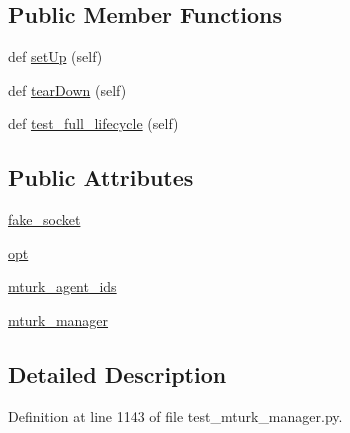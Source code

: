 \subsection*{Public Member Functions}
\begin{DoxyCompactItemize}
\item 
def \hyperlink{classparlai_1_1mturk_1_1core_1_1test_1_1test__mturk__manager_1_1TestMTurkManagerLifecycleFunctions_ad110fce7c0b667907acf9482edea7b3b}{set\+Up} (self)
\item 
def \hyperlink{classparlai_1_1mturk_1_1core_1_1test_1_1test__mturk__manager_1_1TestMTurkManagerLifecycleFunctions_a597cbfdc5382c94258e1be44af00818a}{tear\+Down} (self)
\item 
def \hyperlink{classparlai_1_1mturk_1_1core_1_1test_1_1test__mturk__manager_1_1TestMTurkManagerLifecycleFunctions_ae2a7198f22d5533f4947426457b9fc75}{test\+\_\+full\+\_\+lifecycle} (self)
\end{DoxyCompactItemize}
\subsection*{Public Attributes}
\begin{DoxyCompactItemize}
\item 
\hyperlink{classparlai_1_1mturk_1_1core_1_1test_1_1test__mturk__manager_1_1TestMTurkManagerLifecycleFunctions_a9ddbd7a32913dcb12f0934cafe636529}{fake\+\_\+socket}
\item 
\hyperlink{classparlai_1_1mturk_1_1core_1_1test_1_1test__mturk__manager_1_1TestMTurkManagerLifecycleFunctions_a235dd6261d7d4a9342bf418720167070}{opt}
\item 
\hyperlink{classparlai_1_1mturk_1_1core_1_1test_1_1test__mturk__manager_1_1TestMTurkManagerLifecycleFunctions_a3cdf6084f889a6e9cbd6f131be9995eb}{mturk\+\_\+agent\+\_\+ids}
\item 
\hyperlink{classparlai_1_1mturk_1_1core_1_1test_1_1test__mturk__manager_1_1TestMTurkManagerLifecycleFunctions_a6494c547e22e5e536a19c24ee33a33f1}{mturk\+\_\+manager}
\end{DoxyCompactItemize}


\subsection{Detailed Description}


Definition at line 1143 of file test\+\_\+mturk\+\_\+manager.\+py.



